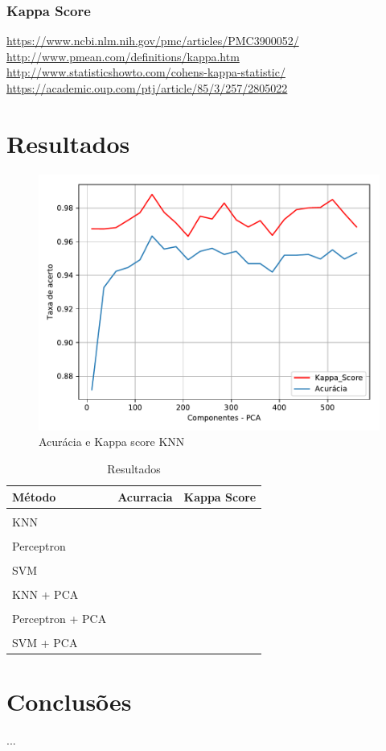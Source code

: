 \documentclass[12pt]{article}
\begin{document}
	\subsubsection{Kappa Score}
	
		\url{https://www.ncbi.nlm.nih.gov/pmc/articles/PMC3900052/}\\
		\url{http://www.pmean.com/definitions/kappa.htm}\\
		\url{http://www.statisticshowto.com/cohens-kappa-statistic/}\\
		\url{https://academic.oup.com/ptj/article/85/3/257/2805022}
		
\section{Resultados}

	\begin{figure}[!htb]
	\centering
	\includegraphics[width=.5\textwidth]{knn_pca_quadratic.pdf}
	\caption{Acurácia e Kappa score KNN}
	\label{fig:knnpcaquadratic}
	\end{figure}

\begin{table}[ht]
	\centering
	\caption{Resultados}
	\label{table:resultados}
	\smallskip
	\begin{tabular}{|l|c|c|}
		\hline
		Método& Acurracia & Kappa Score\\[0.5ex]
		\hline
		&&\\[-2ex]
		KNN & & \\[0.5ex]
		\hline
		&&\\[-2ex]
		Perceptron & & \\[0.5ex]
		\hline
		&&\\[-2ex]
		SVM &  &\\[0.5ex]
		\hline
		&&\\[-2ex]
		KNN + PCA & & \\[0.5ex]
		\hline
		&&\\[-2ex]
		Perceptron + PCA & & \\[0.5ex]
		\hline
		&&\\[-2ex]
		SVM + PCA & & \\[0.5ex]
		\hline
	\end{tabular}
\end{table}

\section{Conclusões}
	...



\end{document}
